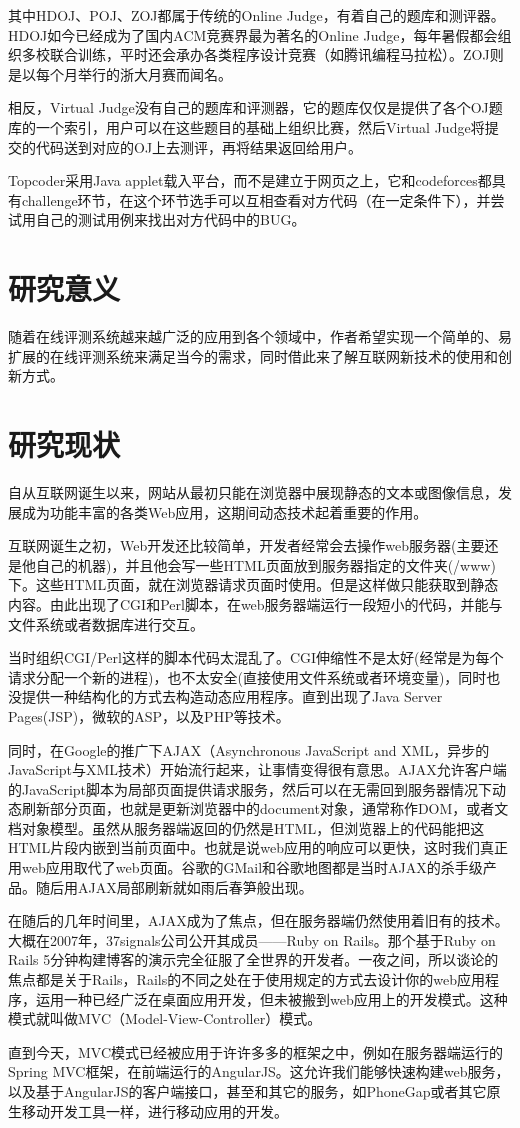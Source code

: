 其中HDOJ、POJ、ZOJ都属于传统的Online Judge，有着自己的题库和测评器。HDOJ如今已经成为了国内ACM竞赛界最为著名的Online Judge，每年暑假都会组织多校联合训练，平时还会承办各类程序设计竞赛（如腾讯编程马拉松）。ZOJ则是以每个月举行的浙大月赛而闻名。

相反，Virtual Judge没有自己的题库和评测器，它的题库仅仅是提供了各个OJ题库的一个索引，用户可以在这些题目的基础上组织比赛，然后Virtual Judge将提交的代码送到对应的OJ上去测评，再将结果返回给用户。

Topcoder采用Java applet载入平台，而不是建立于网页之上，它和codeforces都具有challenge环节，在这个环节选手可以互相查看对方代码（在一定条件下），并尝试用自己的测试用例来找出对方代码中的BUG。

\section{研究意义}
随着在线评测系统越来越广泛的应用到各个领域中，作者希望实现一个简单的、易扩展的在线评测系统来满足当今的需求，同时借此来了解互联网新技术的使用和创新方式。

\section{研究现状}
自从互联网诞生以来，网站从最初只能在浏览器中展现静态的文本或图像信息，发展成为功能丰富的各类Web应用，这期间动态技术起着重要的作用。

互联网诞生之初，Web开发还比较简单，开发者经常会去操作web服务器(主要还是他自己的机器)，并且他会写一些HTML页面放到服务器指定的文件夹(/www)下。这些HTML页面，就在浏览器请求页面时使用。但是这样做只能获取到静态内容。由此出现了CGI和Perl脚本，在web服务器端运行一段短小的代码，并能与文件系统或者数据库进行交互。

当时组织CGI/Perl这样的脚本代码太混乱了。CGI伸缩性不是太好(经常是为每个请求分配一个新的进程)，也不太安全(直接使用文件系统或者环境变量)，同时也没提供一种结构化的方式去构造动态应用程序。直到出现了Java Server Pages(JSP)，微软的ASP，以及PHP等技术。

同时，在Google的推广下AJAX（Asynchronous JavaScript and XML，异步的JavaScript与XML技术）开始流行起来，让事情变得很有意思。AJAX允许客户端的JavaScript脚本为局部页面提供请求服务，然后可以在无需回到服务器情况下动态刷新部分页面，也就是更新浏览器中的document对象，通常称作DOM，或者文档对象模型。虽然从服务器端返回的仍然是HTML，但浏览器上的代码能把这HTML片段内嵌到当前页面中。也就是说web应用的响应可以更快，这时我们真正用web应用取代了web页面。谷歌的GMail和谷歌地图都是当时AJAX的杀手级产品。随后用AJAX局部刷新就如雨后春笋般出现。

在随后的几年时间里，AJAX成为了焦点，但在服务器端仍然使用着旧有的技术。大概在2007年，37signals公司公开其成员——Ruby on Rails。那个基于Ruby on Rails 5分钟构建博客的演示完全征服了全世界的开发者。一夜之间，所以谈论的焦点都是关于Rails，Rails的不同之处在于使用规定的方式去设计你的web应用程序，运用一种已经广泛在桌面应用开发，但未被搬到web应用上的开发模式。这种模式就叫做MVC（Model-View-Controller）模式。

直到今天，MVC模式已经被应用于许许多多的框架之中，例如在服务器端运行的Spring MVC框架，在前端运行的AngularJS。这允许我们能够快速构建web服务，以及基于AngularJS的客户端接口，甚至和其它的服务，如PhoneGap或者其它原生移动开发工具一样，进行移动应用的开发。